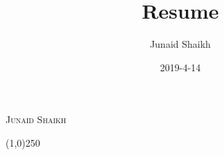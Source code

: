 \documentclass[10pt,twoside,a4paper]{article}
\title{Resume}
\date{2019-4-14}
\author{Junaid Shaikh}
\begin{document}
\begin{center}


	{\scshape \LARGE Junaid Shaikh}

	\line(1,0){250}

\end{center}
\end{document}
